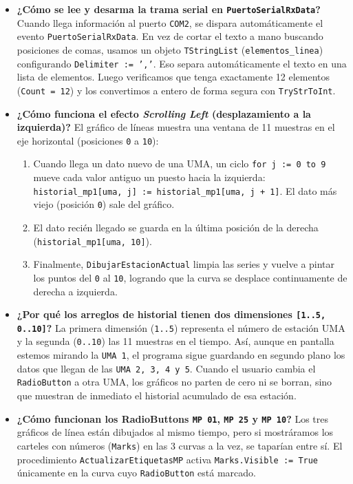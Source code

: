 \documentclass[11pt,a4paper]{article}
\begin{document}
\begin{itemize}[leftmargin=1.5em]
    \item \textbf{¿Cómo se lee y desarma la trama serial en \texttt{PuertoSerialRxData}?}
    Cuando llega información al puerto \texttt{COM2}, se dispara automáticamente el evento \texttt{PuertoSerialRxData}. En vez de cortar el texto a mano buscando posiciones de comas, usamos un objeto \texttt{TStringList} (\texttt{elementos\_linea}) configurando \texttt{Delimiter := ','}. Eso separa automáticamente el texto en una lista de elementos. Luego verificamos que tenga exactamente 12 elementos (\texttt{Count = 12}) y los convertimos a entero de forma segura con \texttt{TryStrToInt}.
    
    \item \textbf{¿Cómo funciona el efecto \emph{Scrolling Left} (desplazamiento a la izquierda)?}
    El gráfico de líneas muestra una ventana de 11 muestras en el eje horizontal (posiciones \texttt{0} a \texttt{10}):
    \begin{enumerate}
        \item Cuando llega un dato nuevo de una UMA, un ciclo \texttt{for j := 0 to 9} mueve cada valor antiguo un puesto hacia la izquierda: \texttt{historial\_mp1[uma, j] := historial\_mp1[uma, j + 1]}. El dato más viejo (posición \texttt{0}) sale del gráfico.
        \item El dato recién llegado se guarda en la última posición de la derecha (\texttt{historial\_mp1[uma, 10]}).
        \item Finalmente, \texttt{DibujarEstacionActual} limpia las series y vuelve a pintar los puntos del \texttt{0} al \texttt{10}, logrando que la curva se desplace continuamente de derecha a izquierda.
    \end{enumerate}
    
    \item \textbf{¿Por qué los arreglos de historial tienen dos dimensiones \texttt{[1..5, 0..10]}?}
    La primera dimensión (\texttt{1..5}) representa el número de estación UMA y la segunda (\texttt{0..10}) las 11 muestras en el tiempo. Así, aunque en pantalla estemos mirando la \texttt{UMA 1}, el programa sigue guardando en segundo plano los datos que llegan de las \texttt{UMA 2, 3, 4 y 5}. Cuando el usuario cambia el \texttt{RadioButton} a otra UMA, los gráficos no parten de cero ni se borran, sino que muestran de inmediato el historial acumulado de esa estación.
    
    \item \textbf{¿Cómo funcionan los RadioButtons \texttt{MP 01}, \texttt{MP 25} y \texttt{MP 10}?}
    Los tres gráficos de línea están dibujados al mismo tiempo, pero si mostráramos los carteles con números (\texttt{Marks}) en las 3 curvas a la vez, se taparían entre sí. El procedimiento \texttt{ActualizarEtiquetasMP} activa \texttt{Marks.Visible := True} únicamente en la curva cuyo \texttt{RadioButton} está marcado.
    

\end{itemize}
\end{document}
